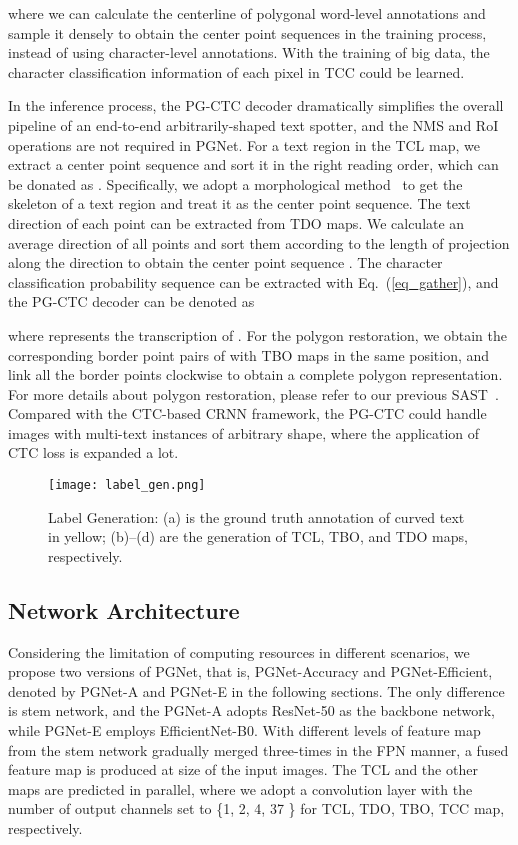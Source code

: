 \documentclass[letterpaper]{article} \usepackage{aaai21}  \usepackage{times}  \usepackage{helvet} \usepackage{courier}  \usepackage[hyphens]{url}  \usepackage{graphicx} \urlstyle{rm} \def\UrlFont{\rm}  \usepackage{natbib}  \usepackage{caption} \usepackage{bm}
\begin{document}
where we can calculate the centerline of polygonal word-level annotations and sample it densely to obtain the center point sequences  in the training process, instead of using character-level annotations. With the training of big data, the character classification information of each pixel in TCC could be learned. 

In the inference process, the PG-CTC decoder dramatically simplifies the overall pipeline of an end-to-end arbitrarily-shaped text spotter, and the NMS and RoI operations are not required in PGNet. For a text region in the TCL map, we extract a center point sequence and sort it in the right reading order, which can be donated as . Specifically, we adopt a morphological method~\cite{zhang1984fast} to get the skeleton of a text region and treat it as the center point sequence. The text direction of each point can be extracted from TDO maps. We calculate an average direction of all points and sort them according to the length of projection along the direction to obtain the center point sequence . 
The character classification probability sequence  can be extracted with Eq.~(\ref{eq_gather}), and the PG-CTC decoder can be denoted as 

where  represents the transcription of . For the polygon restoration, we obtain the corresponding border point pairs of  with TBO maps in the same position, and link all the border points clockwise to obtain a complete polygon representation. For more details about polygon restoration, please refer to our previous SAST~\cite{wang2019single}. Compared with the CTC-based CRNN framework, the PG-CTC could handle images with multi-text instances of arbitrary shape, where the application of CTC loss is expanded a lot. 

\begin{figure}
    \centering
    \texttt{[image: label\_gen.png]}
    \caption{Label Generation: (a) is the ground truth annotation of curved text in yellow; (b)--(d) are the generation of TCL, TBO, and TDO maps, respectively.}
    \label{fig:datagen}
\end{figure}


\subsection{Network Architecture}
Considering the limitation of computing resources in different scenarios, we propose two versions of PGNet, that is, PGNet-Accuracy and PGNet-Efficient, denoted by PGNet-A and PGNet-E in the following sections. The only difference is stem network, and the PGNet-A adopts ResNet-50 as the backbone network, while PGNet-E employs EfficientNet-B0. With different levels of feature map from the stem network gradually merged three-times in the FPN manner, a fused feature map  is produced at  size of the input images. The TCL and the other maps are predicted in parallel, where we adopt a  convolution layer with the number of output channels set to \{1, 2, 4, 37 \} for TCL, TDO, TBO, TCC map, respectively. 
\end{document}

